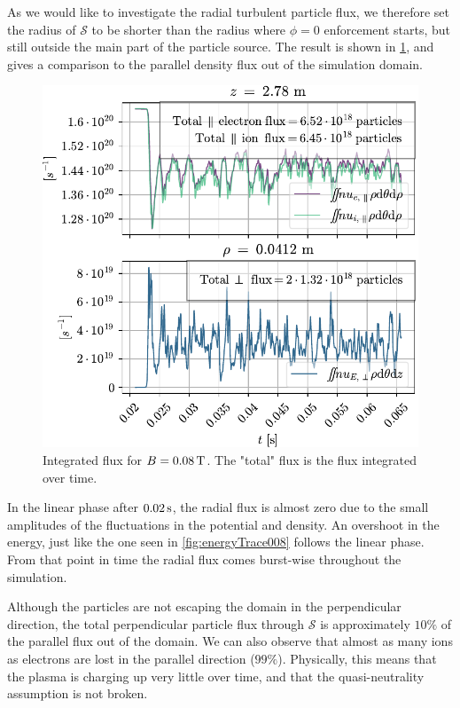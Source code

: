As we would like to investigate the radial turbulent particle flux, we therefore set the radius of $\mathcal{S}$ to be shorter than the radius where $\phi=0$ enforcement starts, but still outside the main part of the particle source.
The result is shown in \cref{fig:flux008}, and gives a comparison to the parallel density flux out of the simulation domain.
%
\begin{figure}[htb]
    \centering
    \includegraphics{fig/results/totalFlux/flux008}
    \caption{Integrated flux for $B=0.08\, \text{T}$.
        The "total" flux is the flux integrated over time.}
    \label{fig:flux008}
\end{figure}
%
In the linear phase after $0.02\, \text{s}$, the radial flux is almost zero due to the small amplitudes of the fluctuations in the potential and density.
An overshoot in the energy, just like the one seen in \cref{fig:energyTrace008} follows the linear phase.
From that point in time the radial flux comes burst-wise throughout the simulation.

Although the particles are not escaping the domain in the perpendicular direction, the total perpendicular particle flux through $\mathcal{S}$
is approximately $10\%$ of the parallel flux out of the domain.
We can also observe that almost as many ions as electrons are lost in the parallel direction ($99\%$).
Physically, this means that the plasma is charging up very little over time, and that the quasi-neutrality assumption is not broken.
